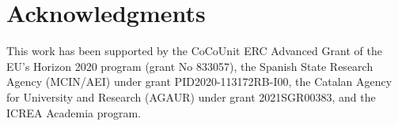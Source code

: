 \section{Acknowledgments}\label{s:Acknowledgments}

This work has been supported by the CoCoUnit ERC Advanced Grant of the EU’s Horizon 2020 program (grant No 833057), the Spanish State Research Agency (MCIN/AEI) under grant PID2020-113172RB-I00, the Catalan Agency for University and Research (AGAUR) under grant 2021SGR00383, and the ICREA Academia program. 